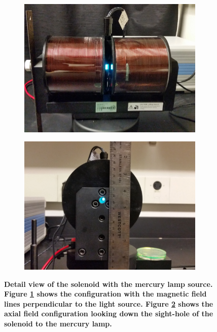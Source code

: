 \documentclass[twocolumn]{article}
\begin{document}
	\begin{figure}
		\centering
		\begin{subfigure}{0.5\textwidth}
			\includegraphics[width = 0.98\textwidth]{Images/PerpendicularView.jpg}
			\caption{}
			\label{subfig:PerpView}
		\end{subfigure}%
		\begin{subfigure}{0.5\textwidth}
			\includegraphics[width = 0.98\textwidth]{Images/AxialView.jpg}
			\caption{}
			\label{subfig:AxialView}
		\end{subfigure}%
		\caption{\textbf{Detail view of the solenoid with the mercury lamp source. Figure \ref{subfig:PerpView} shows the configuration with the magnetic field lines perpendicular to the light source. Figure \ref{subfig:AxialView} shows the axial field configuration looking down the sight-hole of the solenoid to the mercury lamp.}}
		\label{fig:SolenoidDetail}
	\end{figure}
	
\end{document}
